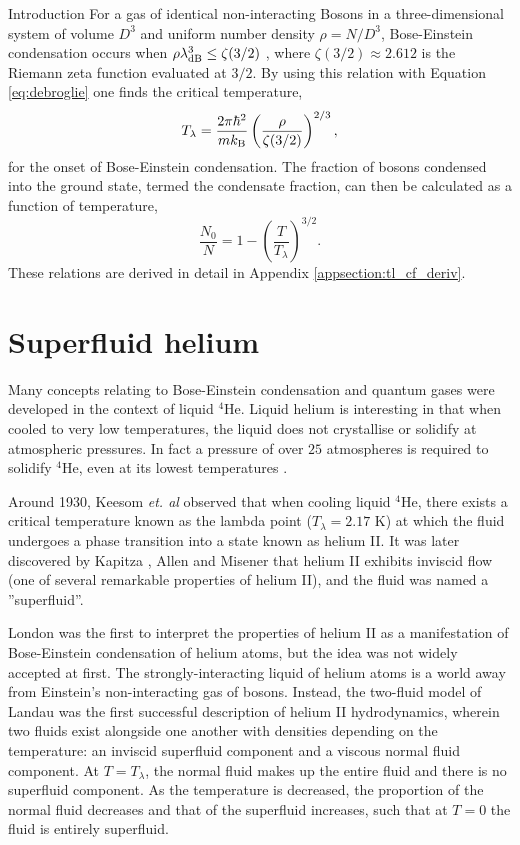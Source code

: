 \begin{chapter}{\label{cha:bose_gases}Introduction}
For a gas of identical non-interacting Bosons in a three-dimensional system of volume $D^3$ and uniform number density $\rho=N/D^3$, Bose-Einstein condensation occurs when $\rho\lambda_{\rm dB}^3 \leq \zeta(3/2)$ \cite{Pethick,huang1987statistical}, where $\zeta(3/2)\approx2.612$ is the Riemann zeta function evaluated at $3/2$. By using this relation with Equation \ref{eq:debroglie} one finds the critical temperature,
\begin{equation}
T_\lambda = \frac{2\pi\hbar^2}{mk_{\rm B}} \left ( \frac{\rho}{\zeta(3/2)} \right )^{2/3},
\label{eq:tlambda}
\end{equation}
for the onset of Bose-Einstein condensation. The fraction of bosons condensed into the ground state, termed the condensate fraction, can then be calculated as a function of temperature,
\begin{equation}
	\frac{N_0}{N} = 1 - \left( \frac{T}{T_\lambda}\right )^{3/2}.
\end{equation}
These relations are derived in detail in Appendix \ref{appsection:tl_cf_deriv}.
\section{Superfluid helium}
Many concepts relating to Bose-Einstein condensation and quantum gases were developed in the context of liquid $^4$He. Liquid helium is interesting in that when cooled to very low temperatures, the liquid does not crystallise or solidify at atmospheric pressures. In fact a pressure of over $25$ atmospheres is required to solidify $^4$He, even at its lowest temperatures \cite{Pethick}. 

Around 1930, Keesom {\it et. al} \cite{Keesom27,Keesom35} observed that when cooling liquid $^4$He, there exists a critical temperature known as the lambda point ($T_\lambda = 2.17$ K) at which the fluid undergoes a phase transition into a state known as helium II. It was later discovered by Kapitza \cite{Kapitza}, Allen and Misener \cite{Allen38} that helium II exhibits inviscid flow (one of several remarkable properties of helium II), and the fluid was named a ''superfluid''.

London \cite{London38,London38b} was the first to interpret the properties of helium II as a manifestation of Bose-Einstein condensation of helium atoms, but the idea was not widely accepted at first. The strongly-interacting liquid of helium atoms is a world away from Einstein's non-interacting gas of bosons. Instead, the two-fluid model of Landau \cite{Landau41} was the first successful description of helium II hydrodynamics, wherein two fluids exist alongside one another with densities depending on the temperature: an inviscid superfluid component and a viscous normal fluid component. At $T=T_\lambda$, the normal fluid makes up the entire fluid and there is no superfluid component. As the temperature is decreased, the proportion of the normal fluid decreases and that of the superfluid increases, such that at $T=0$ the fluid is entirely superfluid.


\end{chapter}
